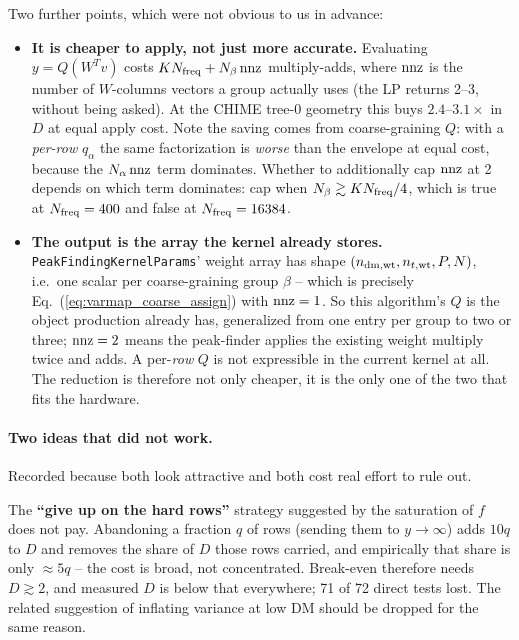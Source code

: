 \documentclass{article}
\numberwithin{equation}{section}   %
\begin{document}
Two further points, which were not obvious to us in advance:

\begin{itemize}

\item {\bf It is cheaper to apply, not just more accurate.} Evaluating $y = Q(W^Tv)$ costs
 $K N_{\rm freq} + N_\beta\,{\rm nnz}$ multiply-adds, where ${\rm nnz}$ is the number of $W$-columns
 vectors a group actually uses (the LP returns 2--3, without being asked). At the CHIME tree-0
 geometry this buys $2.4$--$3.1\times$ in $D$ at equal apply cost. Note the
 saving comes from coarse-graining $Q$: with a {\em per-row} $q_\alpha$ the same factorization is
 {\em worse} than the envelope at equal cost, because the $N_\alpha\,{\rm nnz}$ term dominates.
 Whether to additionally cap ${\rm nnz}$ at 2 depends on which term dominates: cap when
 $N_\beta \gtrsim K N_{\rm freq}/4$, which is true at $N_{\rm freq} = 400$ and false at
 $N_{\rm freq} = 16384$.

\item {\bf The output is the array the kernel already stores.} \verb|PeakFindingKernelParams|'
 weight array has shape $(n_{\rm dm,wt}, n_{t,\rm wt}, P, N)$, i.e.\ one scalar per
 coarse-graining group $\beta$ -- which is precisely Eq.\ (\ref{eq:varmap_coarse_assign}) with
 ${\rm nnz} = 1$. So this algorithm's $Q$ is the object production already has, generalized from
 one entry per group to two or three; ${\rm nnz} = 2$ means the peak-finder applies the existing
 weight multiply twice and adds. A per-{\em row} $Q$ is not expressible in the current
 kernel at all. The reduction is therefore not only cheaper, it is the only one of the two that
 fits the hardware.

\end{itemize}

\paragraph*{Two ideas that did not work.}
Recorded because both look attractive and both cost real effort to rule out.

The {\bf ``give up on the hard rows''} strategy suggested by the saturation of $f$ does not pay.
Abandoning a fraction $q$ of rows (sending them to $y \to \infty$) adds $10q$ to $D$ and removes
the share of $D$ those rows carried, and empirically that share is only $\approx 5q$ -- the
cost is broad, not concentrated. Break-even therefore needs $D \gtrsim 2$, and measured $D$ is
below that everywhere; 71 of 72 direct tests lost. The related suggestion of inflating variance
at low DM should be dropped for the same reason.
\end{document}
